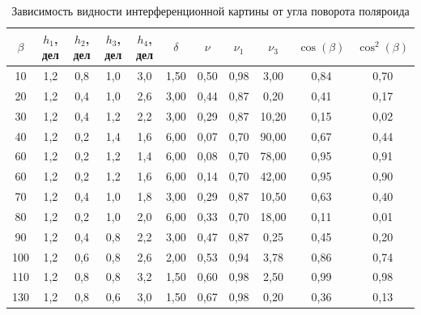 \documentclass[a4paper]{article}
\begin{document}
\begin{table}[!ht]
    \centering
    \caption{Зависимость видности интерференционной картины от угла поворота поляроида}
    \begin{tabular}{|c|c|c|c|c|c|c|c|c|c|c|}
    \hline
    $\beta$ & $h_1$, дел & $h_2$, дел & $h_3$, дел & $h_4$, дел & $\delta$ & $\nu$ & $\nu_1$ & $\nu_3$ & $\cos(\beta)$ & $\cos^2(\beta)$ \\ \hline
    10                 & 1,2   & 0,8   & 1,0   & 3,0   & 1,50     & 0,50  & 0,98    & 3,00    & 0,84          & 0,70            \\ \hline
    20                 & 1,2   & 0,4   & 1,0   & 2,6   & 3,00     & 0,44  & 0,87    & 0,20    & 0,41          & 0,17            \\ \hline
    30                 & 1,2   & 0,4   & 1,2   & 2,2   & 3,00     & 0,29  & 0,87    & 10,20   & 0,15          & 0,02            \\ \hline
    40                 & 1,2   & 0,2   & 1,4   & 1,6   & 6,00     & 0,07  & 0,70    & 90,00   & 0,67          & 0,44            \\ \hline
    60                 & 1,2   & 0,2   & 1,2   & 1,4   & 6,00     & 0,08  & 0,70    & 78,00   & 0,95          & 0,91            \\ \hline
    60                 & 1,2   & 0,2   & 1,2   & 1,6   & 6,00     & 0,14  & 0,70    & 42,00   & 0,95          & 0,90            \\ \hline
    70                 & 1,2   & 0,4   & 1,0   & 1,8   & 3,00     & 0,29  & 0,87    & 10,50   & 0,63          & 0,40            \\ \hline
    80                 & 1,2   & 0,2   & 1,0   & 2,0   & 6,00     & 0,33  & 0,70    & 18,00   & 0,11          & 0,01            \\ \hline
    90                 & 1,2   & 0,4   & 0,8   & 2,2   & 3,00     & 0,47  & 0,87    & 0,25    & 0,45          & 0,20            \\ \hline
    100                & 1,2   & 0,6   & 0,8   & 2,6   & 2,00     & 0,53  & 0,94    & 3,78    & 0,86          & 0,74            \\ \hline
    110                & 1,2   & 0,8   & 0,8   & 3,2   & 1,50     & 0,60  & 0,98    & 2,50    & 0,99          & 0,98            \\ \hline
    130                & 1,2   & 0,8   & 0,6   & 3,0   & 1,50     & 0,67  & 0,98    & 0,20    & 0,36          & 0,13            \\ \hline
    \end{tabular}
    \end{table}
\end{document}
